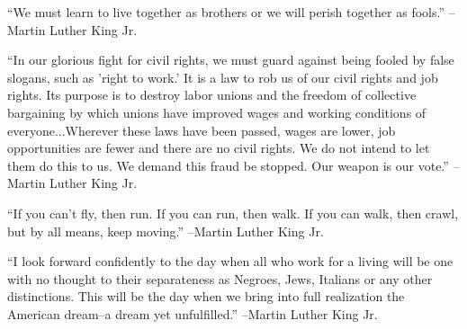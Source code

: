 \documentclass{article}%
\begin{document}
\linebreak%
\vspace{1mm}%
\begin{minipage}{\textwidth}%
\flushleft%
“We must learn to live together as brothers or we will perish together as fools.”%
\linebreak%
\vspace{1mm}%
–Martin Luther King Jr.%
\linebreak%
\vspace{1mm}%
\end{minipage}%
\linebreak%
\vspace{1mm}%
\begin{minipage}{\textwidth}%
\flushleft%
“In our glorious fight for civil rights, we must guard against being fooled by false slogans, such as 'right to work.' It is a law to rob us of our civil rights and job rights. Its purpose is to destroy labor unions and the freedom of collective bargaining by which unions have improved wages and working conditions of everyone...Wherever these laws have been passed, wages are lower, job opportunities are fewer and there are no civil rights. We do not intend to let them do this to us. We demand this fraud be stopped. Our weapon is our vote.”%
\linebreak%
\vspace{1mm}%
–Martin Luther King Jr.%
\linebreak%
\vspace{1mm}%
\end{minipage}%
\linebreak%
\vspace{1mm}%
\begin{minipage}{\textwidth}%
\flushleft%
“If you can't fly, then run. If you can run, then walk. If you can walk, then crawl, but by all means, keep moving.”%
\linebreak%
\vspace{1mm}%
–Martin Luther King Jr.%
\linebreak%
\vspace{1mm}%
\end{minipage}%
\linebreak%
\vspace{1mm}%
\begin{minipage}{\textwidth}%
\flushleft%
“I look forward confidently to the day when all who work for a living will be one with no thought to their separateness as Negroes, Jews, Italians or any other distinctions. This will be the day when we bring into full realization the American dream–a dream yet unfulfilled.”%
\linebreak%
\vspace{1mm}%
–Martin Luther King Jr.%
\linebreak%
\vspace{1mm}%
\end{minipage}%
\end{document}
